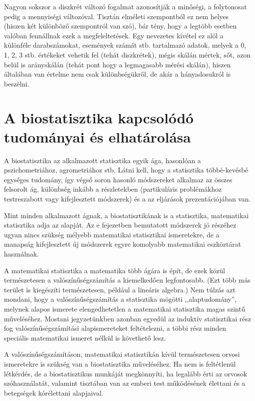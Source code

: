 \documentclass[]{book}
\begin{document}
Nagyon sokszor a diszkrét változó fogalmat azonosítják a minőségi, a folytonosat pedig a mennyiségi változóval. Tisztán elméleti szempontból ez nem helyes (hiszen két különböző szempontról van szó), bár tény, hogy a legtöbb esetben valóban fennállnak ezek a megfeleltetések. Egy nevezetes kivétel ez alól a különféle darabszámokat, események számát stb. tartalmazó adatok, melyek a 0, 1, 2, 3 stb. értékeket vehetik fel (tehát diszkrétek), mégis skálán mértek, sőt, azon belül is arányskálán (tehát pont hogy a legmagasabb mérési skálán), hiszen általában van értelme nem csak különbségükről, de akár a hányadosukról is beszélni.

\hypertarget{alapokvelhatarolas}{%
\section{A biostatisztika kapcsolódó tudományai és elhatárolása}\label{alapokvelhatarolas}}

A biostatisztika az alkalmazott statisztika egyik ága, hasonlóan a pszichometriához, agrometriához stb. Látni kell, hogy a statisztika többé-kevésbé egységes tudomány, így végső soron hasonló módszereket alkalmaz az összes felsorolt ág, különbség inkább a részletekben (partikuláris problémákhoz testreszabott vagy kifejlesztett módszerek) és a az eljárások prezentációjában van.

Mint minden alkalmazott ágnak, a biostatisztikának is a statisztika, matematikai statisztika adja az alapját. Az e fejezetben bemutatott módszerek jó részéhez ugyan nincs szükség mélyebb matematikai statisztikai ismeretekre, de a manapság kifejlesztett új módszerek egyre komolyabb matematikai eszköztárat használnak.

A matematikai statisztika a matematika több ágára is épít, de ezek közül természetesen a valószínűségszámítás a kiemelkedően legfontosabb. (Ezt több más terület is kiegészíti természetesen, például a lineáris algebra.) Nem túlzás azt mondani, hogy a valószínűségszámítás a statisztika mögötti ,,alaptudomány'', melynek alapos ismerete elengedhetetlen a matematikai statisztika magas szintű műveléséhez. Mostani jegyzetünkben azonban egyedül az induktív statisztikai rész fog valószínűségszámítási alapismereteket feltételezni, a többi rész minden speciális matematikai ismeret nélkül is követhető lesz.

A valószínűségszámításon, matematikai statisztikán kívül természetesen orvosi ismeretekre is szükség van a biostatisztika műveléséhez. Ha nem is feltétlenül létkérdés, de a biostatisztikus munkáját megkönnyíti, ha legalább érti az orvosok szóhasználatát, valamint tisztában van az emberi test működésének élettani és a betegségek kórélettani alapjaival.
\end{document}
